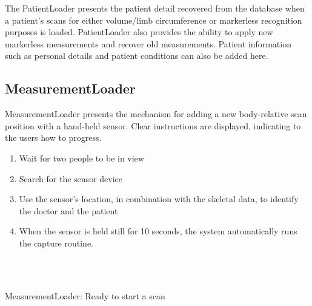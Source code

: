 The PatientLoader presents the patient detail recovered from the database when a patient's scans for either volume/limb circumference or markerless recognition purposes is loaded. PatientLoader also provides the ability to apply new markerless measurements and recover old measurements. Patient information such as personal details and patient conditions can also be added here. \\

\subsection{MeasurementLoader}
MeasurementLoader presents the mechanism for adding a new body-relative scan position with a hand-held sensor. Clear instructions are displayed, indicating to the users how to progress.\\

\begin{enumerate}
    \item Wait for two people to be in view
    \item Search for the sensor device
    \item Use the sensor's location, in combination with the skeletal data, to identify the doctor and the patient
    \item When the sensor is held still for 10 seconds, the system automatically runs the capture routine.
\end{enumerate} \\

\begin{center}
    \setlength\fboxsep{0pt}
    \setlength\fboxrule{0.5pt}
    \\
    \caption{MeasurementLoader: Ready to start a scan}
\end{center} \\

